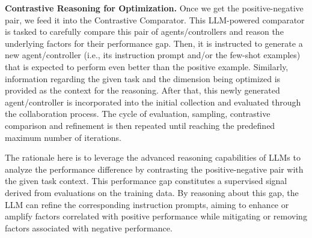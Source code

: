 



\noindent \textbf{Contrastive Reasoning for Optimization.} Once we get the positive-negative pair, we feed it into the Contrastive Comparator. This LLM-powered comparator is tasked to carefully compare this pair of agents/controllers and reason the underlying factors for their performance gap. Then, it is instructed to generate a new agent/controller (i.e., its instruction prompt and/or the few-shot examples) that is expected to perform even better than the positive example. Similarly, information regarding the given task and the dimension being optimized is provided as the context for the reasoning. After that, this newly generated agent/controller is incorporated into the initial collection and evaluated through the collaboration process. The cycle of evaluation, sampling, contrastive comparison and refinement is then repeated until reaching the predefined maximum number of iterations.

The rationale here is to leverage the advanced reasoning capabilities of LLMs to analyze the performance difference by contrasting the positive-negative pair with the given task context. This performance gap constitutes a supervised signal derived from evaluations on the training data. By reasoning about this gap, the LLM can refine the corresponding instruction prompts, aiming to enhance or amplify factors correlated with positive performance while mitigating or removing factors associated with negative performance.




